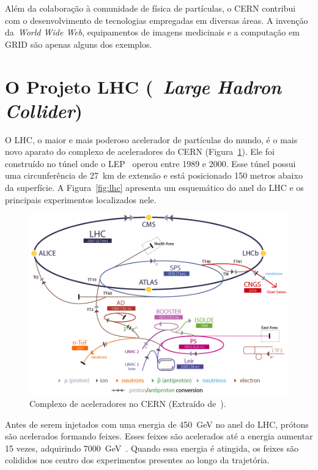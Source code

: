 Além da colaboração à comunidade de física de partículas, o CERN contribui com
o desenvolvimento de tecnologias empregadas em diversas áreas. A invenção
da~\emph{World Wide Web}, equipamentos de imagens medicinais e a computação em
GRID são apenas alguns dos exemplos.

\section{O Projeto LHC (~\emph{Large Hadron Collider})}

O LHC, o maior e mais poderoso acelerador de partículas do mundo, é o mais novo
aparato do complexo de aceleradores do CERN (Figura~\ref{fig:cerncomplex}). Ele
foi construído no túnel onde o LEP~\cite{ref:PICASSO1990} operou entre 1989 e
2000.  Esse túnel possui uma circunferência de 27~km de extensão e está
posicionado 150 metros abaixo da superfície. A Figura~\ref{fig:lhc} apresenta
um esquemático do anel do LHC e os principais experimentos localizados nele.

\begin{figure}[htpb!]
    \centering
    \includegraphics[width=12cm]{images/complexo_acelerador_CERN.png}
    \caption[Complexo de aceleradores no CERN.]{Complexo de aceleradores no CERN
    (Extraído de~\cite{ref:solans}).}
    \label{fig:cerncomplex}
\end{figure}

Antes de serem injetados com uma energia de 450~GeV no anel do LHC, prótons são
acelerados formando feixes. Esses feixes são acelerados até a energia
aumentar 15 vezes, adquirindo 7000~GeV~\cite{ref:solans}. Quando essa energia é
atingida, os feixes são colididos nos centro dos experimentos presentes ao longo
da trajetória.

